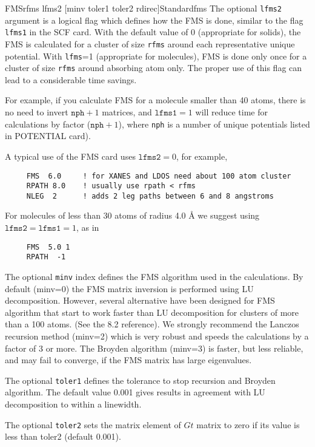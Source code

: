 \documentclass[11pt,oneside]{report} %
\begin{document}
\begin{Card}{FMS}{rfms  lfms2 [minv toler1 toler2 rdirec]}{Standard}{fms}
  The optional \texttt{lfms2} argument is a logical flag which defines
  how the FMS is done, similar to the flag \texttt{lfms1} in the
  SCF card.  With the default value of 0 (appropriate for
  solids), the FMS is calculated for a cluster of size \texttt{rfms}
  around each representative unique potential.  With \texttt{lfms}=1
  (appropriate for molecules), FMS is done only once
  for a cluster of size \texttt{rfms} around absorbing atom only.
  The proper use of this flag can lead to a considerable time
  savings.

  For example, if you calculate FMS for a molecule smaller than 40
  atoms, there is no need to invert $\mathtt{nph}+1$ matrices, and
  $\mathtt{lfms1}=1$ will reduce time for calculations by factor
  ($\mathtt{nph}+1$), where \texttt{nph} is a number of unique
  potentials listed in POTENTIAL card).

  A typical use of the FMS card uses $\mathtt{lfms2}=0$, for example,

\begin{verbatim}
     FMS  6.0     ! for XANES and LDOS need about 100 atom cluster
     RPATH 8.0    ! usually use rpath < rfms
     NLEG  2      ! adds 2 leg paths between 6 and 8 angstroms
\end{verbatim}

  For molecules of less than 30 atoms of radius 4.0 {\AA} we suggest
  using $\mathtt{lfms2}=\mathtt{lfms1}=1$, as in

 \begin{verbatim}
     FMS  5.0 1
     RPATH  -1
 \end{verbatim}

  The optional \texttt{minv} index defines the FMS algorithm used
in the calculations.
By default (minv=0)
 the FMS matrix inversion is performed using LU decomposition. However,
several alternative have been designed for FMS algorithm that start to
work faster than LU decomposition for clusters of more than a 100 atoms.
(See the {\feff}8.2 reference).
We strongly recommend the Lanczos recursion method (minv=2) which is very robust
and speeds the calculations by a factor of 3 or more.
The Broyden algorithm (minv=3) is faster, but less reliable, and 
may fail to converge, if the FMS matrix has large eigenvalues.

  The optional \texttt{toler1} defines the tolerance to stop
recursion and Broyden algorithm. The default value 0.001 gives results
in agreement with LU decomposition to within a linewidth. 

  The optional \texttt{toler2} sets the matrix element of $Gt$ matrix
to zero if its value is less than toler2 (default 0.001).


\end{Card}
\end{document}
